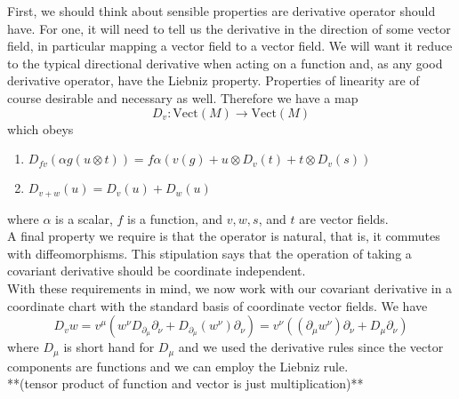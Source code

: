 First, we should think about sensible properties are derivative operator should have.  For one, it will need to tell us the derivative in the direction of some vector field, in particular mapping a vector field to a vector field.  We will want it reduce to the typical directional derivative when acting on a function and, as any good derivative operator, have the Liebniz property.  Properties of linearity are of course desirable and necessary as well.  Therefore we have a map 
\begin{equation*}
	D_v: \text{Vect}(M) \to \text{Vect}(M)
\end{equation*}  
 which obeys 
 \begin{enumerate}
 	\item $D_{fv}(\alpha g (u \otimes t)) = f\alpha \left(v(g)+u\otimes D_v(t)+t\otimes D_v(s) \right)$
 	\item $D_{v+w}(u) = D_v(u)+D_w(u)$
 \end{enumerate}
 where $\alpha$ is a scalar, $f$ is a function, and $v, w, s$, and $t$ are vector fields.\\
A final property we require is that the operator is natural, that is, it commutes with diffeomorphisms.  This stipulation says that the operation of taking a covariant derivative should be coordinate independent.\\

With these requirements in mind, we now work with our covariant derivative in a coordinate chart with the standard basis of coordinate vector fields.  We have
\begin{equation*}
	D_vw = v^\mu (w^\nu D_{\partial_\mu} \partial_\nu+D_{\partial_\mu}(w^\nu)\partial_\nu ) = v^\nu((\partial_\mu w^\nu)\partial_\nu + D_\mu \partial_\nu)
\end{equation*}
 where $D_\mu$ is short hand for $D_{\mu}$ and we used the derivative rules since the vector components are functions and we can employ the Liebniz rule.\\
 **(tensor product of function and vector is just multiplication)**\\
 
